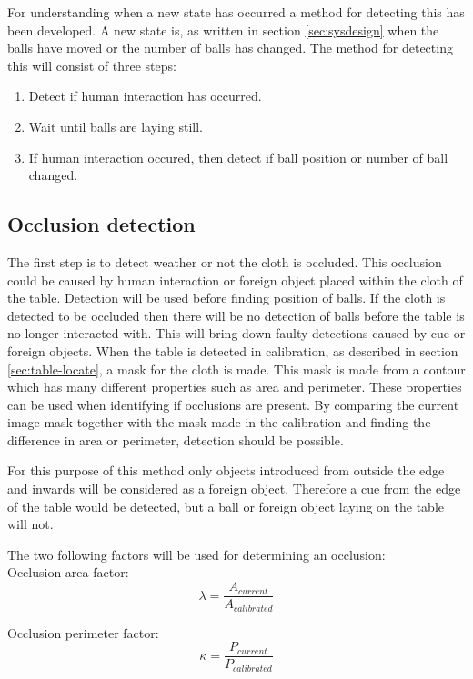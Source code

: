 For understanding when a new state has occurred a method for detecting this has been developed. A new state is, as written in section \ref{sec:sysdesign} when the balls have moved or the number of balls has changed. The method for detecting this will consist of three steps:
\begin{enumerate}
	\item Detect if human interaction has occurred.
	\item Wait until balls are laying still.
	\item If human interaction occured, then detect if ball position or number of ball changed.
\end{enumerate}

\subsection{Occlusion detection}
The first step is to detect weather or not the cloth is occluded. This occlusion could be caused by human interaction or foreign object placed within the cloth of the table. Detection will be used before finding position of balls. If the cloth is detected to be occluded then there will be no detection of balls before the table is no longer interacted with. This will bring down faulty detections caused by cue or foreign objects. When the table is detected in calibration, as described in section \ref{sec:table-locate}, a mask for the cloth is made. This mask is made from a contour which has many different properties such as area and perimeter. These properties can be used when identifying if occlusions are present. By comparing the current image mask together with the mask made in the calibration and finding the difference in area or perimeter, detection should be possible.

For this purpose of this method only objects introduced from outside the edge and inwards will be considered as a foreign object. Therefore a cue from the edge of the table would be detected, but a ball or foreign object laying on the table will not.

The two following factors will be used for determining an occlusion:\\

Occlusion area factor:
\begin{equation}
\lambda = \frac{A_{current}}{A_{calibrated}}
\label{eq:area}
\end{equation}

Occlusion perimeter factor:
\begin{equation}
\kappa = \frac{P_{current}}{P_{calibrated}}
\label{eq:perimeter}
\end{equation}

